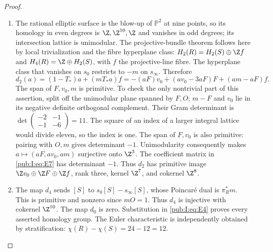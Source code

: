 \begin{proof}
\begin{enumerate}[label=\arabic*.,leftmargin=*]
\item The rational elliptic surface is the blow-up of $\mathbb P^2$ at nine
points, so its homology in even degrees is $\Z,\Z^{10},\Z$ and
vanishes in odd degrees; its intersection lattice is unimodular.
The projective-bundle theorem follows here by local trivialization
and the fibre hyperplane class: $H_2(R)=H_2(S)\oplus\Z f$ and
$H_4(R)=\Z\oplus H_2(S)$, with $f$ the projective-line fibre.
The hyperplane class that vanishes on $s_0$ restricts to $-m$ on
$s_\infty$. Therefore
\begin{equation}
 d_2(a)=(1-T_*)a+(mT_*a)f
       =-(aF)v_0+(av_0-3aF)F+(am-aF)f.
\label{pub:I:eq:E7}
\end{equation}
The span of $F,v_0,m$ is primitive. To check the only nontrivial
part of this assertion, split off the unimodular plane spanned by
$F,O$; $m-F$ and $v_0$ lie in its negative definite orthogonal
complement. Their Gram determinant is
$\det\left(\begin{smallmatrix}-2&-1\\-1&-6\end{smallmatrix}\right)=11$.
The square of an index of a larger integral lattice would divide
eleven, so the index is one. The span of $F,v_0$ is also primitive:
pairing with $O,m$ gives determinant $-1$. Unimodularity consequently
makes $a\mapsto(aF,av_0,am)$ surjective onto $\Z^3$. The coefficient
matrix in \eqref{pub:I:eq:E7} has determinant $-1$. Thus $d_2$ has primitive image
$\Z v_0\oplus\Z F\oplus\Z f$, rank three, kernel $\Z^7$,
and cokernel $\Z^8$.

\item The map $d_4$ sends $[S]$ to $s_0[S]-s_\infty[S]$, whose Poincar\'e
dual is $\pi_R^*m$. This is primitive and nonzero since $mO=1$.
Thus $d_4$ is injective with cokernel $\Z^{10}$. The map $d_0$ is
zero. Substitution in \eqref{pub:I:eq:E4} proves every asserted homology group.
The Euler characteristic is independently obtained by stratification:
$\chi(R)-\chi(S)=24-12=12$. 
\end{enumerate}
\end{proof}
